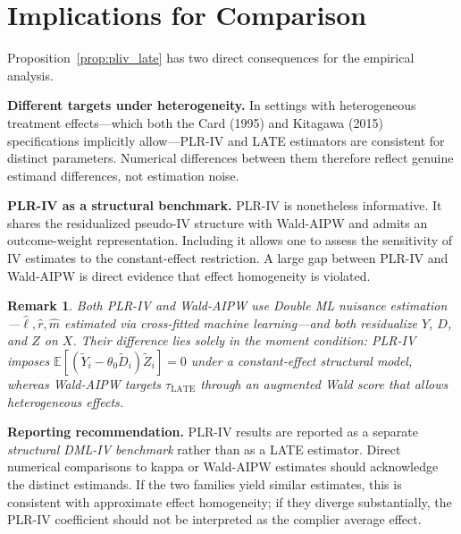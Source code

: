 \documentclass[12pt,a4paper]{article}
\newtheorem{remark}{Remark}
\newcommand{\E}{\mathbb{E}}
\newcommand{\tY}{\widetilde{Y}}
\newcommand{\tD}{\widetilde{D}}
\newcommand{\tZ}{\widetilde{Z}}
\begin{document}
\section{Implications for Comparison}

Proposition~\ref{prop:pliv_late} has two direct consequences for the empirical analysis.

\medskip\noindent\textbf{Different targets under heterogeneity.}
In settings with heterogeneous treatment effects---which both the Card (1995) and
Kitagawa (2015) specifications implicitly allow---PLR-IV and LATE estimators are
consistent for distinct parameters.  Numerical differences between them therefore reflect
genuine estimand differences, not estimation noise.

\medskip\noindent\textbf{PLR-IV as a structural benchmark.}
PLR-IV is nonetheless informative.  It shares the residualized pseudo-IV structure with
Wald-AIPW \citep[cf.][]{knaus2024double} and admits an outcome-weight representation.
Including it allows one to assess the sensitivity of IV estimates to the constant-effect
restriction.  A large gap between PLR-IV and Wald-AIPW is direct evidence that effect
homogeneity is violated.

\begin{remark}
Both PLR-IV and Wald-AIPW use Double ML nuisance estimation---$\hat\ell,\hat r,\hat m$
estimated via cross-fitted machine learning---and both residualize $Y$, $D$, and $Z$ on
$X$.  Their difference lies solely in the moment condition: PLR-IV imposes
$\E[(\tY_i-\theta_0\tD_i)\tZ_i]=0$ under a constant-effect structural model, whereas
Wald-AIPW targets $\tau_{\mathrm{LATE}}$ through an augmented Wald score that allows
heterogeneous effects.
\end{remark}

\medskip\noindent\textbf{Reporting recommendation.}
PLR-IV results are reported as a separate \emph{structural DML-IV benchmark} rather than
as a LATE estimator.  Direct numerical comparisons to kappa or Wald-AIPW estimates
should acknowledge the distinct estimands.  If the two families yield similar estimates,
this is consistent with approximate effect homogeneity; if they diverge substantially,
the PLR-IV coefficient should not be interpreted as the complier average effect.



\end{document}
